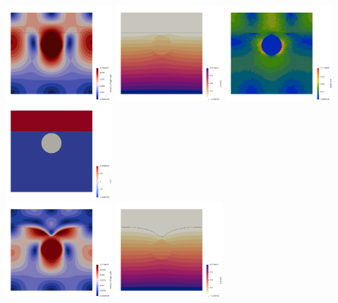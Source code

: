 \begin{center}
\includegraphics[width=4cm]{python_codes/fieldstone_93/results_exp2/vel_0000}
\includegraphics[width=4cm]{python_codes/fieldstone_93/results_exp2/p_0000}
\includegraphics[width=4cm]{python_codes/fieldstone_93/results_exp2/sr_0000}
\includegraphics[width=4cm]{python_codes/fieldstone_93/results_exp2/mat_0000}\\
\includegraphics[width=4cm]{python_codes/fieldstone_93/results_exp2/vel_0136}
\includegraphics[width=4cm]{python_codes/fieldstone_93/results_exp2/p_0136}

\end{center}
